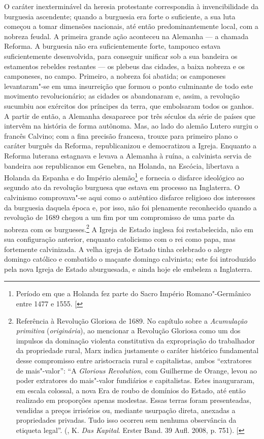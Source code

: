 O caráter inexterminável da heresia protestante correspondia à
invencibilidade da burguesia ascendente; quando a burguesia era forte o
suficiente, a sua luta começou a tomar dimensões nacionais, até então
predominantemente local, com a nobreza feudal. A primeira grande ação
aconteceu na Alemanha --- a chamada Reforma. A burguesia não era
suficientemente forte, tampouco estava suficientemente desenvolvida,
para conseguir unificar sob a sua bandeira os estamentos rebeldes
restantes --- os plebeus das cidades, a baixa nobreza e os camponeses, no
campo. Primeiro, a nobreza foi abatida; os camponeses levantaram"-se em
uma insurreição que formou o ponto culminante de todo este movimento
revolucionário; as cidades os abandonaram e, assim, a revolução sucumbiu
aos exércitos dos príncipes da terra, que embolsaram todos os ganhos. A
partir de então, a Alemanha desaparece por três séculos da série de
países que intervêm na história de forma autônoma. Mas, ao lado do
alemão Lutero surgiu o
francês Calvino;
com a fina precisão francesa, trouxe para primeiro plano o caráter
burguês da Reforma, republicanizou e democratizou a Igreja. Enquanto a
Reforma luterana estagnava e levava a Alemanha à ruína, a calvinista
servia de bandeira aos republicanos em Genebra, na Holanda, na Escócia,
libertava a Holanda da Espanha e do Império alemão\footnote{Período em que a Holanda fez parte do Sacro Império Romano"-Germânico
  entre 1477 e 1555. {[}\versal{N.\,T.}{]}} e fornecia o
disfarce ideológico ao segundo ato da revolução burguesa que estava em
processo na Inglaterra. O calvinismo comprovava"-se aqui como o autêntico
disfarce religioso dos interesses da burguesia daquela época e, por
isso, não foi plenamente reconhecido quando a revolução de 1689 chegou a
um fim por um compromisso de uma parte da nobreza com os burgueses.\footnote{Referência à Revolução Gloriosa de 1689. No
  capítulo sobre a \emph{Acumulação primitiva} (\emph{originária}), ao
  mencionar a Revolução Gloriosa como um dos impulsos da dominação
  violenta constitutiva da expropriação do trabalhador da propriedade
  rural, Marx indica justamente o caráter histórico fundamental desse
  compromisso entre aristocracia rural e capitalistas, ambos
  ``extratores de mais"-valor'': ``A \emph{Glorious Revolution}, com
  Guilherme  de Orange, levou ao poder extratores do mais"-valor
  fundiários e capitalistas. Estes inauguraram, em escala colossal, a
  nova Era de roubo de domínios do Estado, até então realizado em
  proporções apenas modestas. Essas terras foram presenteadas, vendidas
  a preços irrisórios ou, mediante usurpação direta, anexadas a
  propriedades privadas. Tudo isso ocorreu sem nenhuma observância da
  etiqueta legal''. (, K. \emph{Das Kapital}. Erster Band. 39 Aufl.
  2008, p. 751). {[}\versal{N.\,T.}{]}} A Igreja de Estado
inglesa foi restabelecida, não em sua configuração anterior, enquanto
catolicismo com o rei como papa, mas fortemente calvinizada. A velha
igreja de Estado tinha celebrado o alegre domingo católico e combatido o
maçante domingo calvinista; este foi introduzido pela nova Igreja de
Estado aburguesada, e ainda hoje ele embeleza a Inglaterra.

